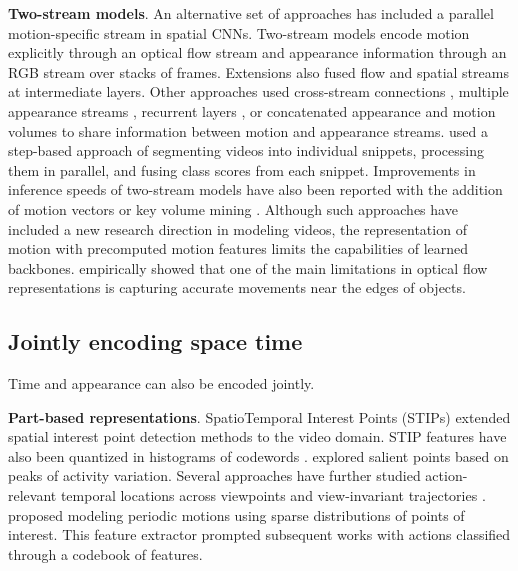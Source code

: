 \noindent
\textbf{Two-stream models}. An alternative set of approaches has included a parallel motion-specific stream in spatial CNNs. Two-stream models \citep{simonyan2014two} encode motion explicitly through an optical flow stream and appearance information through an RGB stream over stacks of frames. Extensions \citep{feichtenhofer2016convolutional} also fused flow and spatial streams at intermediate layers. Other approaches used cross-stream connections \citep{feichtenhofer2017spatiotemporal}, multiple appearance streams \citep{tu2018multistream}, recurrent layers \citep{singh2016multi}, or concatenated appearance and motion volumes \citep{jain2015modeep,wang2017spatiotemporal} to share information between motion and appearance streams. \citet{wang2016temporal} used a step-based approach of segmenting videos into individual snippets, processing them in parallel, and fusing class scores from each snippet. Improvements in inference speeds of two-stream models have also been reported with the addition of motion vectors \citep{zhang2016real} or key volume mining \citep{zhu2016key}. Although such approaches have included a new research direction in modeling videos, the representation of motion with precomputed motion features limits the capabilities of learned backbones. \citet{sevilla2019integration} empirically showed that one of the main limitations in optical flow representations is capturing accurate movements near the edges of objects.

\subsection{Jointly encoding space time}
\label{sec:modeling::joint}

 Time and appearance can also be encoded jointly. 

\noindent
\textbf{Part-based representations}. SpatioTemporal Interest Points (STIPs) \citep{laptev2003space} extended spatial interest point detection methods \citep{forstner1987fast,harris1988combined} to the video domain. STIP features have also been quantized in histograms of codewords \citep{schuldt2004recognizing}. \citet {liu2008learning,oikonomopoulos2005spatiotemporal} explored salient points based on peaks of activity variation. Several approaches have further studied action-relevant temporal locations across viewpoints \citep{yilmaz2006matching} and view-invariant trajectories \citep{sheikh2005exploring}. \citet{dollar2005behavior} proposed modeling periodic motions using sparse distributions of points of interest. This feature extractor prompted subsequent works \citep{niebles2008unsupervised} with actions classified through a codebook of features.

